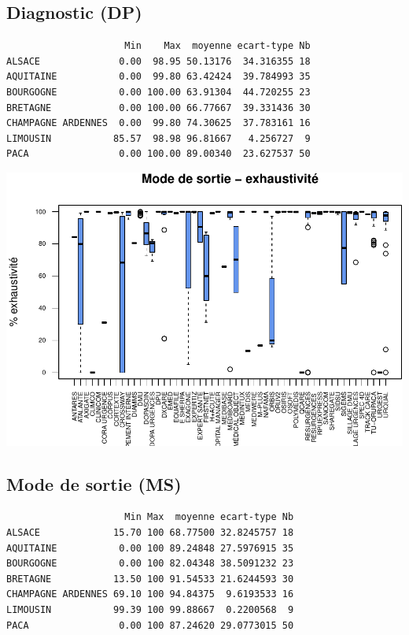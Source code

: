 \documentclass[]{article}
\begin{document}
\subsection{Diagnostic (DP)}\label{diagnostic-dp-2}

\begin{verbatim}
                     Min    Max  moyenne ecart-type Nb
ALSACE              0.00  98.95 50.13176  34.316355 18
AQUITAINE           0.00  99.80 63.42424  39.784993 35
BOURGOGNE           0.00 100.00 63.91304  44.720255 23
BRETAGNE            0.00 100.00 66.77667  39.331436 30
CHAMPAGNE ARDENNES  0.00  99.80 74.30625  37.783161 16
LIMOUSIN           85.57  98.98 96.81667   4.256727  9
PACA                0.00 100.00 89.00340  23.627537 50
\end{verbatim}

\includegraphics{septembre2015_files/figure-latex/unnamed-chunk-28-1.pdf}

\subsection{Mode de sortie (MS)}\label{mode-de-sortie-ms-2}

\begin{verbatim}
                     Min Max  moyenne ecart-type Nb
ALSACE             15.70 100 68.77500 32.8245757 18
AQUITAINE           0.00 100 89.24848 27.5976915 35
BOURGOGNE           0.00 100 82.04348 38.5091232 23
BRETAGNE           13.50 100 91.54533 21.6244593 30
CHAMPAGNE ARDENNES 69.10 100 94.84375  9.6193533 16
LIMOUSIN           99.39 100 99.88667  0.2200568  9
PACA                0.00 100 87.24620 29.0773015 50
\end{verbatim}
\end{document}

